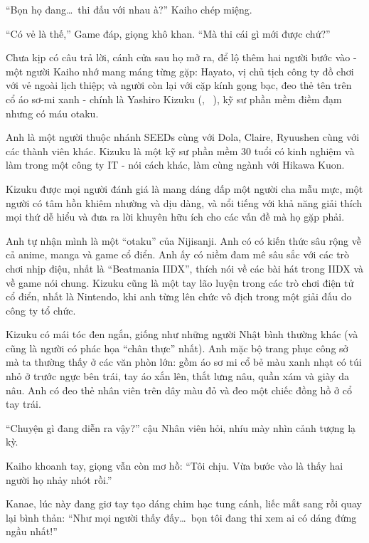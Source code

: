 \documentclass[../main.tex]{subfiles}
\begin{document}
``Bọn họ đang\dots\ thi đấu với nhau à?'' Kaiho chép miệng.

``Có vẻ là thế,'' Game đáp, giọng khô khan. ``Mà thi cái gì mới được chứ?''

Chưa kịp có câu trả lời, cánh cửa sau họ mở ra, để lộ thêm hai người bước vào - một người Kaiho nhớ mang máng từng gặp: Hayato, vị chủ tịch công ty đồ chơi với vẻ ngoài lịch thiệp; và người còn lại với cặp kính gọng bạc, đeo thẻ tên trên cổ áo sơ-mi xanh - chính là Yashiro Kizuku (, \ ), kỹ sư phần mềm điềm đạm nhưng có máu otaku.

\chrint

Anh là một người thuộc nhánh SEEDs cùng với Dola, Claire, Ryuushen cùng với các thành viên khác. Kizuku là một kỹ sư phần mềm 30 tuổi có kinh nghiệm và làm trong một công ty IT - nói cách khác, làm cùng ngành với Hikawa Kuon.

Kizuku được mọi người đánh giá là mang dáng dấp một người cha mẫu mực, một người có tâm hồn khiêm nhường và dịu dàng, và nổi tiếng với khả năng giải thích mọi thứ dễ hiểu và đưa ra lời khuyên hữu ích cho các vấn đề mà họ gặp phải.

Anh tự nhận mình là một ``otaku'' của Nijisanji. Anh có  có kiến thức sâu rộng về cả anime, manga và game cổ điển. Anh ấy có niềm đam mê sâu sắc với các trò chơi nhịp điệu, nhất là ``Beatmania IIDX'', thích nói về các bài hát trong IIDX và về game nói chung. Kizuku cũng là một tay lão luyện trong các trò chơi điện tử cổ điển, nhất là Nintendo, khi anh từng lên chức vô địch trong một giải đấu do công ty tổ chức.

Kizuku có mái tóc đen ngắn, giống như những người Nhật bình thường khác (và cũng là người có phác họa ``chân thực'' nhất). Anh mặc bộ trang phục công sở mà ta thường thấy ở các văn phòn lớn: gồm áo sơ mi cổ bẻ màu xanh nhạt có túi nhỏ ở trước ngực bên trái, tay áo xắn lên, thắt lưng nâu, quần xám và giày da nâu. Anh có đeo thẻ nhân viên trên dây màu đỏ và đeo một chiếc đồng hồ ở cổ tay trái.

\chrint

``Chuyện gì đang diễn ra vậy?'' cậu Nhân viên hỏi, nhíu mày nhìn cảnh tượng lạ kỳ.

Kaiho khoanh tay, giọng vẫn còn mơ hồ: ``Tôi chịu. Vừa bước vào là thấy hai người họ nhảy nhót rồi.''

Kanae, lúc này đang giơ tay tạo dáng chim hạc tung cánh, liếc mắt sang rồi quay lại bình thản: ``Như mọi người thấy đấy\dots\ bọn tôi đang thi xem ai có dáng đứng ngầu nhất!''
\end{document}
